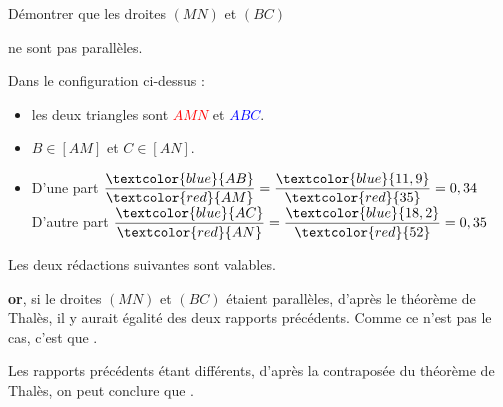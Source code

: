 \begin{methode*1}
\begin{minipage}{8cm}
                Démontrer que les droites $(MN)$ et $(BC)$ 
                
                ne sont pas parallèles.
            \end{minipage}
            
            \correction
            Dans le configuration ci-dessus : 
            \begin{itemize}
                \item les deux triangles sont \textcolor{red}{$AMN$} et \textcolor{blue}{$ABC$}.
                \item $B \in [AM]$ et $C \in [AN]$.
                \item D'une part $\dfrac{\textcolor{blue}{AB}}{\textcolor{red}{AM}} = \dfrac{\textcolor{blue}{11,9}}{\textcolor{red}{35}}=0,34$
                \hfill
                D'autre part $\dfrac{\textcolor{blue}{AC}}{\textcolor{red}{AN}} = \dfrac{\textcolor{blue}{18,2}}{\textcolor{red}{52}}=0,35$
            \end{itemize}

            \begin{remarque}
                Les deux rédactions suivantes sont valables.
            \end{remarque}
            
            \hspace*{0.5cm}

            \begin{minipage}{8cm}
                \textbf{or}, si le droites $(MN)$ et $(BC)$ étaient parallèles, d'après le théorème de Thalès, il y aurait égalité des deux rapports
                précédents. Comme ce n'est pas le cas, c'est que .
    
            \end{minipage}
            \hspace*{0.5cm}
            \vrule
            \hspace*{0.5cm}
            \begin{minipage}{8cm}
                Les rapports précédents étant différents, d'après la contraposée du théorème de Thalès, on peut conclure que .
            \end{minipage}
        \end{methode*1}
